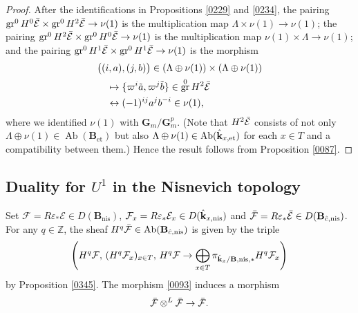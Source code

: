\documentclass{amsart}
\theoremstyle{remark}
\numberwithin{equation}{subsection}
\newcommand{\tensor}{\mathbin{\otimes}}
\newcommand{\Z}{\mathbb{Z}}
\newcommand{\et}{\mathrm{et}}
\newcommand{\Gm}{\mathbf{G}_{m}}
\newcommand{\alg}[1]{\mathbf{#1}}
\newcommand{\nis}{\mathrm{nis}}
\DeclareMathOperator{\Ab}{Ab}
\DeclareMathOperator{\gr}{gr}
\begin{document}
\begin{proof}
	After the identifications in Propositions \ref{0229} and \ref{0234}, the pairing
	$\gr^{0} H^{0} \Bar{\mathcal{E}} \times \gr^{0} H^{2} \Bar{\mathcal{E}} \to \nu(1)$
	is the multiplication map
	$\Lambda \times \nu(1) \to \nu(1)$;
	the pairing
	$\gr^{0} H^{2} \Bar{\mathcal{E}} \times \gr^{0} H^{0} \Bar{\mathcal{E}} \to \nu(1)$
	is the multiplication map
	$\nu(1) \times \Lambda \to \nu(1)$;
	and the pairing
	$\gr^{0} H^{1} \Bar{\mathcal{E}} \times \gr^{0} H^{1} \Bar{\mathcal{E}} \to \nu(1)$
	is the morphism
		\begin{align*}
			&
						\bigl(
							(i, a), (j, b)
						\bigr)
					\in
						(\Lambda \oplus \nu(1)) \times (\Lambda \oplus \nu(1))
			\\
			&	\quad
				\mapsto
						\{\varpi^{i} \Tilde{a}, \varpi^{j} \Tilde{b}\}
					\in
						\gr^{0} H^{2} \Bar{\mathcal{E}}
			\\
			&	\quad
				\leftrightarrow
						(-1)^{i j} a^{j} b^{-i}
					\in
						\nu(1),
		\end{align*}
	where we identified $\nu(1)$ with $\Gm / \Gm^{p}$.
	(Note that $H^{2} \Bar{\mathcal{E}}$ consists of
	not only $\Lambda \oplus \nu(1) \in \Ab(\alg{B}_{\et})$
	but also $\Lambda \oplus \nu(1) \in \Ab(\Hat{\alg{k}}_{x, \et})$ for each $x \in T$
	and a compatibility between them.)
	Hence the result follows from
	Proposition \ref{0087}.
\end{proof}


\subsection{%
	\texorpdfstring{Duality for $U^{1}$ in the Nisnevich topology}
	{Duality for U 1 in the Nisnevich topology}
}
\label{0250}

Set $\mathcal{F} = R \varepsilon_{\ast} \mathcal{E} \in D(\alg{B}_{\nis})$,
$\mathcal{F}_{x} = R \varepsilon_{\ast} \mathcal{E}_{x} \in D(\Hat{\alg{k}}_{x, \nis})$
and $\Bar{\mathcal{F}} = R \varepsilon_{\ast} \Bar{\mathcal{E}} \in D(\alg{B}_{\Hat{c}, \nis})$.
For any $q \in \Z$, the sheaf
$H^{q} \Bar{\mathcal{F}} \in \Ab(\alg{B}_{\Hat{c}, \nis})$
is given by the triple
	\[
		\left(
			H^{q} \mathcal{F},\,
			(H^{q} \mathcal{F}_{x})_{x \in T},\,
				H^{q} \mathcal{F}
			\to
				\bigoplus_{x \in T}
					\pi_{\Hat{\alg{k}}_{x} / \alg{B}, \nis, \ast}
					H^{q} \mathcal{F}_{x}
		\right)
	\]
by Proposition \ref{0345}.
The morphism \eqref{0093} induces a morphism
	\[
				\Bar{\mathcal{F}}
			\tensor^{L}
				\Bar{\mathcal{F}}
		\to
			\Bar{\mathcal{F}}.
	\]
\end{document}
